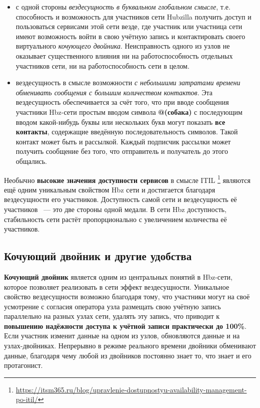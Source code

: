\documentclass[10pt, a5paper]{article}
\begin{document}
\begin{itemize}
  \item с одной стороны \emph{вездесущность в буквальном глобальном смысле}, т.е. способность и возможность для участников сети Hubzilla получить доступ и пользоваться сервисами этой сети везде, где участник или участница сети имеют возможность войти в свою учётную запись и контактировать своего виртуального \emph{кочующего двойника}. Неисправность одного из узлов не оказывает существенного влияния ни на работоспособность отдельных участников сети, ни на работоспособность сети в целом.
  \item вездесущность в смысле возможности \emph{с небольшими затратами времени обменивать сообщения с большим количеством контактов}. Эта вездесущность обеспечивается за счёт того, что при вводе сообщения участники Hbz-сети простым вводом символа \textbf{@(собака)} с последующим вводом какой-нибудь буквы или нескольких букв могут показать \textbf{все контакты}, содержащие введённую последовательность символов. Такой контакт может быть и рассылкой. Каждый подписчик рассылки может получить сообщение без того, что отправитель и получатель до этого общались.
\end{itemize}

Необычно \textbf{высокие значения доступности сервисов} в смысле ITIL \footnote{\url{https://itsm365.ru/blog/upravlenie-dostupnostyu-availability-management-po-itil/}} являются ещё одним уникальным свойством Hbz сети и достигается благодаря вездесущности его участников. Доступность самой сети и вездесущность её участников ~--- это две стороны одной медали. В сети Hbz доступность, стабильность сети растёт пропорционально с увеличением количества её участников.

\subsection*{Кочующий двойник и другие удобства}

\textbf{Кочующий двойник} является одним из центральных понятий в Hbz-сети, которое позволяет реализовать в сети эффект вездесущности. Уникальное свойство  вездесущности возможно благодаря тому, что участники могут на своё усмотрение с согласия оператора узла размещать свою учётную запись параллельно на разных узлах сети, удалять эту запись, что приводит к \textbf{повышению надёжности доступа к учётной записи практически до 100\%}. Если участник изменит данные на одном из узлов, обновляются данные и на узлах-двойниках. Непрерывно в режиме реального времени двойники обменивают данные, благодаря чему любой из двойников постоянно знает то, что знает и его протагонист.
\end{document}
